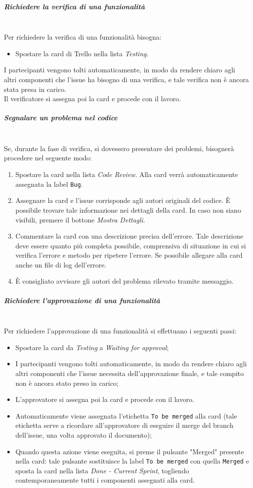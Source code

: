 \subparagraph{Richiedere la verifica di una funzionalità}
\mbox{}\\
Per richiedere la verifica di una funzionalità bisogna:
\begin{itemize}
    \item Spostare la card di Trello nella lista \textit{Testing}.
\end{itemize} 
I partecipanti vengono tolti automaticamente, in modo da rendere chiaro agli altri componenti che l'issue ha bisogno di una verifica, e tale verifica non è ancora stata presa in carico.\\
Il verificatore si assegna poi la card e procede con il lavoro.

\subparagraph{Segnalare un problema nel codice}
\mbox{}\\
Se, durante la fase di verifica, si dovessero presentare dei problemi, bisognerà procedere nel seguente modo:
\begin{enumerate}
    \item Spostare la card nella lista \textit{Code Review}. Alla card verrà automaticamente assegnata la label \texttt{Bug}.
    \item Assegnare la card e l'issue corrisponde agli autori originali del codice. È possibile trovare tale informazione nei dettagli della card. In caso non siano visibili, premere il bottone \textit{Mostra Dettagli}.
    \item Commentare la card con una descrizione precisa dell'errore. Tale descrizione deve essere quanto più completa possibile, comprensiva di situazione in cui si verifica l'errore e metodo per ripetere l'errore. Se possibile allegare alla card anche un file di log dell'errore.
    \item È consigliato avvisare gli autori del problema rilevato tramite messaggio.
\end{enumerate}

\subparagraph{Richiedere l'approvazione di una funzionalità}
\mbox{}\\
Per richiedere l'approvazione di una funzionalità si effettuano i seguenti passi:
\begin{itemize} 
    \item Spostare la card da \textit{Testing} a \textit{Waiting for approval};
    \item I partecipanti vengono tolti automaticamente, in modo da rendere chiaro agli altri componenti che l'issue necessita dell'approvazione finale, e tale compito non è ancora stato preso in carico;
    \item L'approvatore si assegna poi la card e procede con il lavoro.
    \item Automaticamente viene assegnata l'etichetta \texttt{To be merged} alla card (tale etichetta serve a ricordare all'approvatore di eseguire il merge del branch dell'issue, una volta approvato il documento);
    \item Quando questa azione viene eseguita, si preme il pulsante "Merged" presente nella card: tale pulsante sostituisce la label \texttt{To be merged} con quella \texttt{Merged} e sposta la card nella lista \textit{Done - Current Sprint}, togliendo contemporaneamente tutti i componenti assegnati alla card.
\end{itemize}

